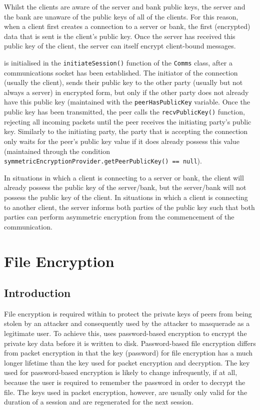 \documentclass[a4paper,11pt]{article}
\begin{document}
Whilst the clients are aware of the server and bank public keys, the server and 
the bank are unaware of the public keys of all of the clients. For this reason, 
when a client first creates a connection to a \serviceName{} server or bank, the
first (encrypted) data that is sent is the client's public key. Once the server
has received this public key of the client, the server can itself encrypt 
client-bound messages.

 is initialised in the \verb+initiateSession()+ 
function of the \verb+Comms+ class, after a communications socket has been 
established. The initiator of the connection (usually the client), sends their
public key to the other party (usually but not always a server) in encrypted 
form, but only if the other party does not already have this public key 
(maintained with the \verb+peerHasPublicKey+ variable. Once the public key has 
been transmitted, the \serviceName{} peer calls the \verb+recvPublicKey()+ 
function, rejecting all incoming packets until the peer receives the initiating 
party's public key. Similarly to the initiating party, the party that is 
accepting the connection only waits for the peer's public key value if it does 
already possess this value (maintained through the condition \\
\verb+symmetricEncryptionProvider.getPeerPublicKey() == null+).

In situations in which a client is connecting to a \serviceName{} server or 
bank, the client will already possess the public key of the server/bank, but the
server/bank will not possess the public key of the client. In situations in 
which a client is connecting to another client, the server informs both parties 
of the public key such that both parties can perform asymmetric encryption from 
the commencement of the communication.
 
\section{File Encryption}

\subsection{Introduction}
File encryption is required within \packageName{} to protect the private keys of
\serviceName{} peers from being stolen by an attacker and consequently used by 
the attacker to masquerade as a legitimate user. To achieve this, \packageName{}
uses password-based encryption to encrypt the private key data before it is 
written to disk. Password-based file encryption differs from \packageName{} 
packet encryption in that the key (password) for file encryption has a much 
longer lifetime than the key used for packet encryption and decryption. The key 
used for password-based encryption is likely to change infrequently, if at all, 
because the user is required to remember the password in order to decrypt the 
file. The keys used in packet encryption, however, are usually only valid for 
the duration of a session and are regenerated for the next session.
\end{document}
